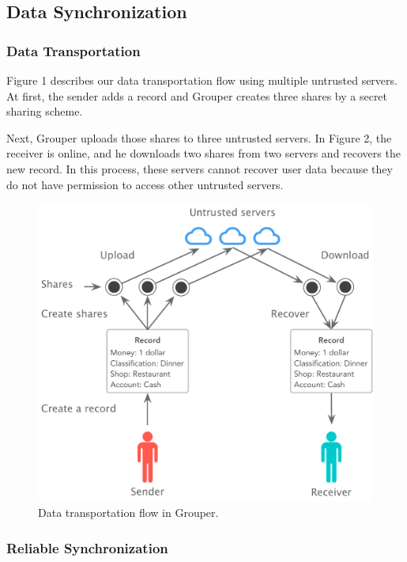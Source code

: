 \documentclass[twocolumn,10pt]{article}
\begin{document}
\subsection{Data Synchronization}

\subsubsection{Data Transportation}

Figure 1 describes our data transportation flow using multiple untrusted servers. 
At first, the sender adds a record and Grouper creates three shares by a secret sharing scheme. 

 
Next, Grouper uploads those shares to three untrusted servers. 
In Figure 2, the receiver is online, and he downloads two shares from two servers and recovers the new record. 
In this process, these servers cannot recover user data because they do not have permission to access other untrusted servers. 

\begin{figure}[t]
	\centering
	\includegraphics[scale=0.36]{sync_flow}
	\caption{Data transportation flow in Grouper.}
\end{figure}

\subsubsection{Reliable Synchronization}
\end{document}
